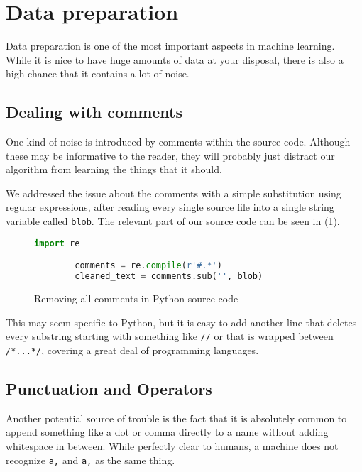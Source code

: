 \section{Data preparation} \label{sec:data_preparation}

  Data preparation is one of the most important aspects in machine
  learning.  While it is nice to have huge amounts of data at your
  disposal, there is also a high chance that it contains a lot of noise.

  \subsection{Dealing with comments} \label{sub:dealing_with_comments}

    One kind of noise is introduced by comments within the source
    code. Although these may be informative to the reader, they will
    probably just distract our algorithm from learning the things that
    it should.

    We addressed the issue about the comments with a simple substitution
    using regular expressions, after reading every single source file
    into a single string variable called \verb+blob+. The relevant part
    of our source code can be seen in (\ref{fig:comments}).

    \begin{figure}[htpb]
      \centering \begin{lstlisting}[language=Python]
        import re

        comments = re.compile(r'#.*')
        cleaned_text = comments.sub('', blob)
      \end{lstlisting} \caption{Removing all comments in Python source
      code} \label{fig:comments}
    \end{figure}

    This may seem specific to Python, but it is easy to add another line
    that deletes every substring starting with something like \verb+//+
    or that is wrapped between \verb+/*...*/+, covering a great deal of
    programming languages.

  \subsection{Punctuation and Operators}
  \label{sub:punctuation_and_operators}

    Another potential source of trouble is the fact that it is
    absolutely common to append something like a dot or comma directly
    to a name without adding whitespace in between. While perfectly
    clear to humans, a machine does not recognize \verb+a,+ and
    \verb+a+\textvisiblespace\verb+,+ as the same thing.

